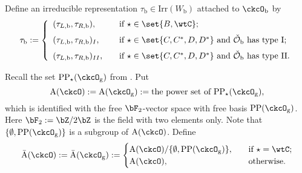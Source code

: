 \documentclass[12pt]{amsart}
\newcommand{\CO}{{\mathcal {O}}}
\newcommand{\Z}{\mathbb{Z}}
\newcommand{\la}{\langle}
\newcommand{\ra}{\rangle}
\numberwithin{equation}{section}
\theoremstyle{remark}
\def\Irr{\mathrm{Irr}}
\def\CPP{\mathrm{PP}}
\def\CPPs{\mathrm{PP}_{\star}}
\begin{document}
 Define an irreducible  representation $\tau_{\mathrm b}\in \Irr(W_{\mathrm b})$ attached to $\ckcO_{\mathrm b}$ by
\begin{equation}\label{eq:taub}
 \tau_{\mathrm b}:= \left\{
     \begin{array}{ll}
       ( \tau_{L,\mathrm b}, \tau_{R,\mathrm b}), \quad
       & \text{if } \star \in \set{B,\wtC}; \medskip\\
         ( \tau_{L,\mathrm b}, \tau_{R,\mathrm b})_I, \quad & \text{if $\star \in \set{C,C^{*}, D,D^{*}}$ and $\check \CO_\mathrm b$ has type I;}\medskip\\
        ( \tau_{L,\mathrm b}, \tau_{R,\mathrm b})_{II}, \quad & \text{if $\star \in \set{C,C^{*}, D,D^{*}}$ and $\check \CO_\mathrm b$ has type II}.
\end{array}
  \right.
\end{equation}



Recall the set  $\CPPs(\ckcO_{\mathrm g})$ from   .   Put
  \[
    {\mathrm A}(\ckcO) := {\mathrm A}(\ckcO_{\mathrm g}):= \textrm{the power set of $\CPPs(\ckcO_{\mathrm g})$},
    \]
    which is identified with the free $\bF_2$-vector space with free basis $\CPP(\ckcO_{\mathrm g})$. Here $\bF_{2}:=\bZ/2\bZ$ is the field with two elements only.
Note that   $\{\emptyset, \CPP(\ckcO_{\mathrm g})\}$ is a subgroup of ${\mathrm A}(\ckcO)$.  Define
   \begin{equation*}%
  \bar{\mathrm A}(\ckcO):= \bar{\mathrm A}(\ckcO_{\mathrm g}):=
  \begin{cases}
 {\mathrm A}(\ckcO)/\{\emptyset, \CPP(\ckcO_{\mathrm g})\}, & \quad \text{if  } \star =\wtC;\\
 {\mathrm A}(\ckcO),  & \quad \text{otherwise.}
  \end{cases}
  \end{equation*}
\end{document}
